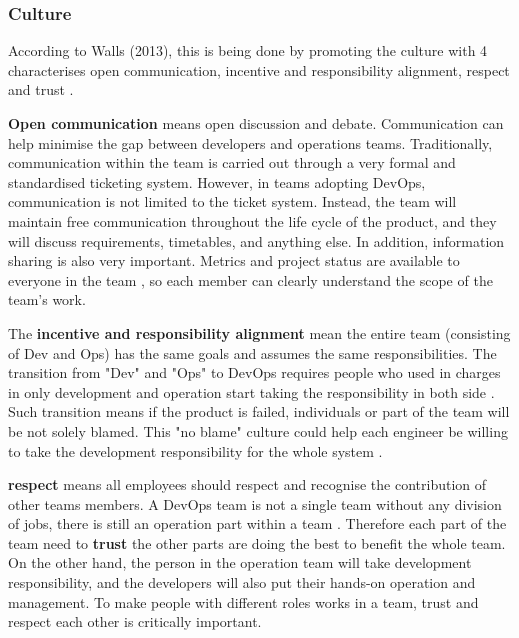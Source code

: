 \subsubsection[]{Culture}
 According to Walls (2013), this is being done by promoting the culture with 4 characterises open communication, incentive and responsibility alignment, respect and trust \cite{walls2013building}.
\par 
\textbf{Open communication} means open discussion and debate. Communication can help minimise the gap between developers and operations teams. Traditionally, communication within the team is carried out through a very formal and standardised ticketing system.
However, in teams adopting DevOps, communication is not limited to the ticket system. Instead, the team will maintain free communication throughout the life cycle of the product, and they will discuss requirements, timetables, and anything else. In addition, information sharing is also very important\cite{lwakatare2015dimensions}. Metrics and project status are available to everyone in the team \label{moniter}, so each member can clearly understand the scope of the team's work.
\par
The \textbf{incentive and responsibility alignment} mean the entire team (consisting of Dev and Ops) has the same goals and assumes the same responsibilities. The transition from "Dev" and "Ops" to DevOps requires people who used in charges in only development and operation start taking the responsibility in both side \cite{lwakatare2015dimensions}.
Such transition means if the product is failed, individuals or part of the team will be not solely blamed. 
This "no blame" culture could help each engineer be willing to take the development responsibility for the whole system \cite{feitelson2013development}.
\par 
\textbf{ respect} means all employees should respect and recognise the contribution of other teams members. A DevOps team is not a single team without any division of jobs, there is still an operation part within a team \cite{TheresNo86:online}. Therefore each part of the team need to \textbf{trust} the other parts are doing the best to benefit the whole team.
On the other hand, the person in the operation team will take development responsibility, and the developers will also put their hands-on operation and management\cite{shropshire2017uncertainty}. To make people with different roles works in a team, trust and respect each other is critically important. 
